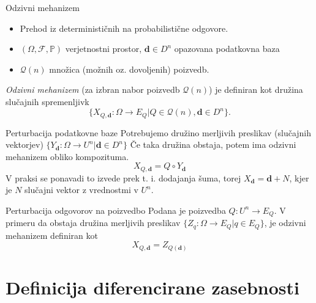 \documentclass{beamer}
\begin{document}
\begin{frame}{Odzivni mehanizem}
\begin{itemize}
\item Prehod iz determinističnih na probabilistične odgovore.
\item  $(\Omega , \mathcal{F}, \mathbb {P} )$ verjetnostni prostor, $\textbf{d}\in D^n$ opazovana podatkovna baza 
\item  $\mathcal{Q}(n)$  množica (možnih oz. dovoljenih) poizvedb. 
\end{itemize}
\textit{Odzivni mehanizem} (za izbran nabor poizvedb $\mathcal{Q}(n)$) je definiran kot družina slučajnih spremenljivk
\begin{equation}\label{odzivni}
 \{X_{Q,\textbf{d}} : \Omega \rightarrow  E_{Q} | Q \in  \mathcal{Q} (n), \textbf{d} \in D^n\} \tag{1}.
\end{equation} 
\end{frame}

\begin{frame}{Perturbacija podatkovne baze}
Potrebujemo družino merljivih preslikav (slučajnih vektorjev) $\{ Y_{\textbf{d}}: \Omega \rightarrow U^n | \textbf{d} \in D^n\}$ Če taka družina obstaja, potem ima odzivni mehanizem obliko kompozituma.
\begin{equation}\label{odzivni2}
 X_{Q,\textbf{d}} = Q \circ Y_{\textbf{d}} \tag{2}
\end{equation} 
V praksi se ponavadi to izvede prek t. i. dodajanja šuma, torej $X_{\textbf{d}} = \textbf{d}+N$, kjer je $N$ slučajni vektor z vrednostmi v $U^n$.
\end{frame}

\begin{frame}{Perturbacija odgovorov na poizvedbo}
Podana je poizvedba $Q: U^n \rightarrow E_{Q}$. V primeru da obstaja družina merljivih preslikav $ \{Z_{q}:\Omega \rightarrow E_{Q} | q  \in E_{Q} \}$, je odzivni mehanizem definiran kot
\begin{equation}\label{odzivni3}
X_{Q,\textbf{d}}=Z_{Q(\textbf{d})}\tag{3}
\end{equation} 
\end{frame}

\section{Definicija diferencirane zasebnosti}
\end{document}

